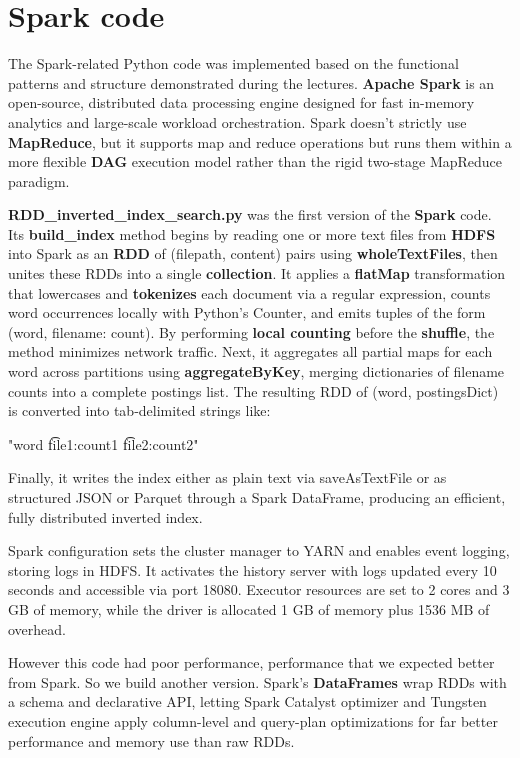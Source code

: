 \section{Spark code}
The Spark-related Python code was implemented based on the functional patterns and structure demonstrated during the lectures. \textbf{Apache Spark} is an open-source, distributed data processing engine designed for fast in-memory analytics and large-scale workload orchestration. Spark doesn’t strictly use \textbf{MapReduce}, but it supports map and reduce operations but runs them within a more flexible \textbf{DAG} execution model rather than the rigid two-stage MapReduce paradigm.

\vspace{4mm}

\textbf{RDD\_inverted\_index\_search.py} was the first version of the \textbf{Spark} code. Its \textbf{build\_index} method begins by reading one or more text files from \textbf{HDFS} into Spark as an \textbf{RDD} of (filepath, content) pairs using \textbf{wholeTextFiles}, then unites these RDDs into a single \textbf{collection}. It applies a \textbf{flatMap} transformation that lowercases and \textbf{tokenizes} each document via a regular expression, counts word occurrences locally with Python’s Counter, and emits tuples of the form (word, {filename: count}). By performing \textbf{local counting} before the \textbf{shuffle}, the method minimizes network traffic. Next, it aggregates all partial maps for each word across partitions using \textbf{aggregateByKey}, merging dictionaries of filename counts into a complete postings list. The resulting RDD of (word, postingsDict) is converted into tab‐delimited strings like:

"word \t file1:count1 \t file2:count2"

Finally, it writes the index either as plain text via saveAsTextFile or as structured JSON or Parquet through a Spark DataFrame, producing an efficient, fully distributed inverted index. 

Spark configuration sets the cluster manager to YARN and enables event logging, storing logs in HDFS. It activates the history server with logs updated every 10 seconds and accessible via port 18080. Executor resources are set to 2 cores and 3 GB of memory, while the driver is allocated 1 GB of memory plus 1536 MB of overhead. 

\vspace{4mm}

However this code had poor performance, performance that we expected better from Spark. So we build another version. Spark's \textbf{DataFrames} wrap RDDs with a schema and declarative API, letting Spark Catalyst optimizer and Tungsten execution engine apply column-level and query-plan optimizations for far better performance and memory use than raw RDDs. 


